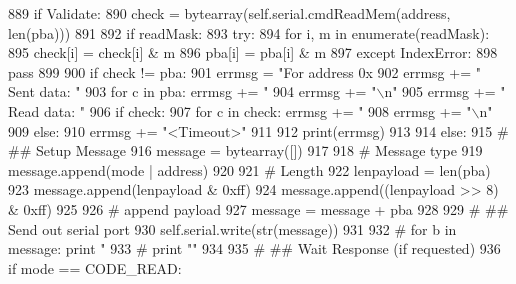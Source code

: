\begin{DoxyCode}
889                 \textcolor{keywordflow}{if} Validate:
890                     check =  bytearray(self.serial.cmdReadMem(address, len(pba)))
891 
892                     \textcolor{keywordflow}{if} readMask:
893                         \textcolor{keywordflow}{try}:
894                             \textcolor{keywordflow}{for} i, m \textcolor{keywordflow}{in} enumerate(readMask):
895                                 check[i] = check[i] & m
896                                 pba[i] = pba[i] & m
897                         \textcolor{keywordflow}{except} IndexError:
898                             \textcolor{keywordflow}{pass}
899 
900                     \textcolor{keywordflow}{if} check != pba:
901                         errmsg = \textcolor{stringliteral}{"For address 0x%
902                         errmsg += \textcolor{stringliteral}{"  Sent data: "}
903                         \textcolor{keywordflow}{for} c \textcolor{keywordflow}{in} pba: errmsg += \textcolor{stringliteral}{"%
904                         errmsg += \textcolor{stringliteral}{"\(\backslash\)n"}
905                         errmsg += \textcolor{stringliteral}{"  Read data: "}
906                         \textcolor{keywordflow}{if} check:
907                             \textcolor{keywordflow}{for} c \textcolor{keywordflow}{in} check: errmsg += \textcolor{stringliteral}{"%
908                             errmsg += \textcolor{stringliteral}{"\(\backslash\)n"}
909                         \textcolor{keywordflow}{else}:
910                             errmsg += \textcolor{stringliteral}{"<Timeout>"}
911 
912                         print(errmsg)
913 
914         \textcolor{keywordflow}{else}:
915             \textcolor{comment}{# ## Setup Message}
916             message = bytearray([])
917 
918             \textcolor{comment}{# Message type}
919             message.append(mode | address)
920 
921             \textcolor{comment}{# Length}
922             lenpayload = len(pba)
923             message.append(lenpayload & 0xff)
924             message.append((lenpayload >> 8) & 0xff)
925 
926             \textcolor{comment}{# append payload}
927             message = message + pba
928 
929             \textcolor{comment}{# ## Send out serial port}
930             self.serial.write(str(message))
931 
932             \textcolor{comment}{# for b in message: print "%
933             \textcolor{comment}{# print ""}
934 
935             \textcolor{comment}{# ## Wait Response (if requested)}
936             \textcolor{keywordflow}{if} mode == CODE\_READ:
}}}}
\end{DoxyCode}
